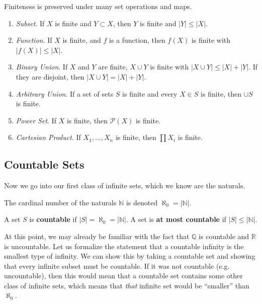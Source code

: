  \begin{theorem}
    Finiteness is preserved under many set operations and maps. 
    \begin{enumerate}
      \item \textit{Subset}. If $X$ is finite and $Y \subset X$, then $Y$ is finite and $|Y| \leq |X|$. 
      \item \textit{Function}. If $X$ is finite, and $f$ is a function, then $f(X)$ is finite with $|f(X)| \leq |X|$. 
      \item \textit{Binary Union}. If $X$ and $Y$ are finite, $X \cup Y$ is finite with $|X \cup Y| \leq |X| + |Y|$.  If they are disjoint, then $|X \cup Y| = |X| + |Y|$. 
      \item \textit{Arbitrary Union}. If a set of sets $S$ is finite and every $X \in S$ is finite, then $\cup S$ is finite. 
      \item \textit{Power Set}. If $X$ is finite, then $\mathcal{P}(X)$ is finite. 
      \item \textit{Cartesian Product}. If $X_1, \ldots, X_n$ is finite, then $\prod X_i$ is finite. 
    \end{enumerate}
  \end{theorem}

\subsection{Countable Sets}

  Now we go into our first class of infinite sets, which we know are the naturals. 

  \begin{definition}
    The cardinal number of the naturals $\mathbb{N}$ is denoted $\aleph_0 = |\mathbb{N}|$. 
  \end{definition}

  \begin{definition}
    \label{def:countable}
    A set $S$ is \textbf{countable} if $|S| = \aleph_0 = |\mathbb{N}|$. A set is \textbf{at most countable} if $|S| \leq |\mathbb{N}|$. 
  \end{definition} 

  At this point, we may already be familiar with the fact that $\mathbb{Q}$ is countable and $\mathbb{R}$ is uncountable. Let us formalize the statement that a countable infinity is the smallest type of infinity. We can show this by taking a countable set and showing that every infinite subset must be countable. If it was not countable (e.g. uncountable), then this would mean that a countable set contains some other class of infinite sets, which means that \textit{that} infinite set would be ``smaller'' than $\aleph_0$. 

